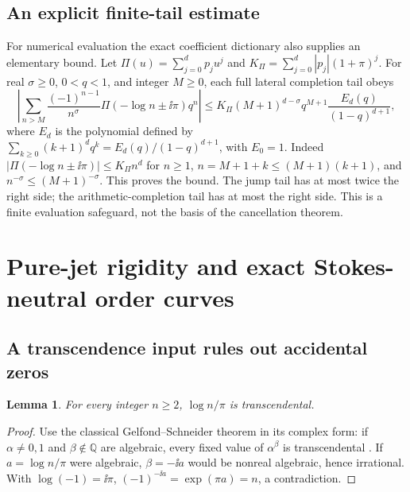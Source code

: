 \documentclass[11pt,a4paper]{article}
\numberwithin{equation}{section}
\newtheorem{lemma}[theorem]{Lemma}
\theoremstyle{definition}\newtheorem{definition}[theorem]{Definition}
\theoremstyle{remark}\newtheorem{remark}[theorem]{Remark}
\newcommand{\Q}{\mathbb Q}\newcommand{\C}{\mathbb C}\newcommand{\R}{\mathbb R}\newcommand{\N}{\mathbb N}
\begin{document}
\subsection{An explicit finite-tail estimate}
For numerical evaluation the exact coefficient dictionary also supplies
an elementary bound. Let $\Pi(u)=\sum_{j=0}^dp_ju^j$ and
$K_\Pi=\sum_{j=0}^d|p_j|(1+\pi)^j$. For real $\sigma\ge0$,
$0<q<1$, and integer $M\ge0$, each full lateral completion tail obeys
\begin{equation}\label{ojf:eq:tailbound}
 \left|\sum_{n>M}\frac{(-1)^{n-1}}{n^\sigma}
                  \Pi(-\log n\pm\ii\pi)q^n\right|
 \le K_\Pi(M+1)^{d-\sigma}q^{M+1}
                  \frac{E_d(q)}{(1-q)^{d+1}},
\end{equation}
where $E_d$ is the polynomial defined by
$\sum_{k\ge0}(k+1)^dq^k=E_d(q)/(1-q)^{d+1}$, with $E_0=1$.
Indeed $|\Pi(-\log n\pm\ii\pi)|\le K_\Pi n^d$ for $n\ge1$,
$n=M+1+k\le(M+1)(k+1)$, and $n^{-\sigma}\le(M+1)^{-\sigma}$.
This proves the bound. The jump tail has at most twice the right side;
the arithmetic-completion tail has at most the right side. This is a
finite evaluation safeguard, not the basis of the cancellation theorem.

\section{Pure-jet rigidity and exact Stokes-neutral order curves}
\label{ojf:sec:neutral}

\subsection{A transcendence input rules out accidental zeros}

\begin{lemma}\label{ojf:lem:log-transcendence}
For every integer $n\ge2$, $\log n/\pi$ is transcendental.
\end{lemma}
\begin{proof}
Use the classical Gelfond--Schneider theorem in its complex form: if
$\alpha\ne0,1$ and $\beta\notin\Q$ are algebraic, every fixed value of
$\alpha^\beta$ is transcendental \cite[Theorem 3.1]{GS}.
If $a=\log n/\pi$ were algebraic, $\beta=-\ii a$ would be nonreal
algebraic, hence irrational. With $\log(-1)=\ii\pi$,
$(-1)^{-\ii a}=\exp(\pi a)=n$, a contradiction.
\end{proof}
\end{document}
